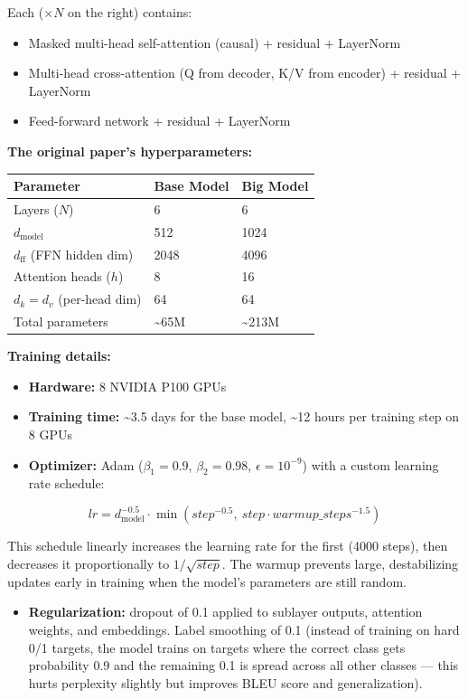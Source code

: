 Each  ($\times N$ on the right) contains:
\begin{itemize}
  \item Masked multi-head self-attention (causal) + residual + LayerNorm
  \item Multi-head cross-attention (Q from decoder, K/V from encoder) + residual + LayerNorm
  \item Feed-forward network + residual + LayerNorm
\end{itemize}

\textbf{The original paper's hyperparameters:}

\begin{center}
\begin{tabular}{lll}
\toprule
Parameter & Base Model & Big Model \\
\midrule
Layers ($N$) & 6 & 6 \\
$d_{\text{model}}$ & 512 & 1024 \\
$d_{\text{ff}}$ (FFN hidden dim) & 2048 & 4096 \\
Attention heads ($h$) & 8 & 16 \\
$d_k = d_v$ (per-head dim) & 64 & 64 \\
Total parameters & \textasciitilde{}65M & \textasciitilde{}213M \\
\bottomrule
\end{tabular}
\end{center}

\textbf{Training details:}

\begin{itemize}
  \item \textbf{Hardware:} 8 NVIDIA P100 GPUs
  \item \textbf{Training time:} \textasciitilde{}3.5 days for the base model, \textasciitilde{}12 hours per training step on 8 GPUs
  \item \textbf{Optimizer:} Adam ($\beta_1 = 0.9$, $\beta_2 = 0.98$, $\epsilon = 10^{-9}$) with a custom learning rate schedule:
\end{itemize}

\[lr = d_{\text{model}}^{-0.5} \cdot \min(step^{-0.5}, \ step \cdot warmup\_steps^{-1.5})\]

This schedule linearly increases the learning rate for the first  (4000 steps), then decreases it proportionally to $1/\sqrt{step}$. The warmup prevents large, destabilizing updates early in training when the model's parameters are still random.

\begin{itemize}
  \item \textbf{Regularization:} dropout of 0.1 applied to sublayer outputs, attention weights, and embeddings. Label smoothing of 0.1 (instead of training on hard 0/1 targets, the model trains on targets where the correct class gets probability 0.9 and the remaining 0.1 is spread across all other classes --- this hurts perplexity slightly but improves BLEU score and generalization).
\end{itemize}

